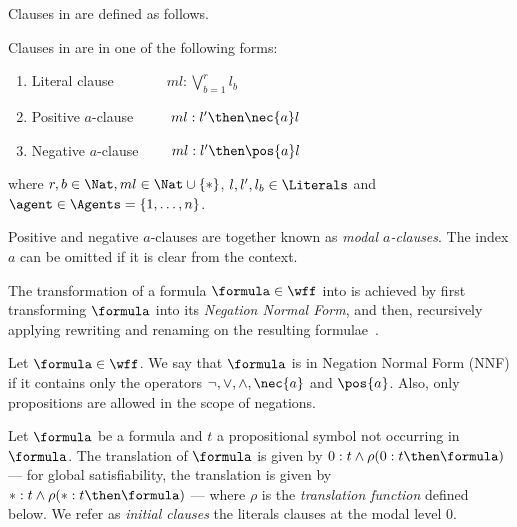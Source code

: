 Clauses in  are defined as follows.

\begin{definition}
    Clauses in  are in one of the following forms:
    \begin{enumerate}
        \item Literal clause $\ \ \quad \qquad ml : \bigvee^r_{b=1} l_b$
        \item Positive $a$-clause $\ \qquad ml : l' \then \nec{a} l$
        \item Negative $a$-clause $\qquad ml : l' \then \pos{a} l$
    \end{enumerate}
    where $r, b \in \Nat, ml \in \Nat \cup \{*\}$, $l, l', l_b \in
    \Literals$ and $\agent \in \Agents = \{1, \ldots, n\}$.
\end{definition}

Positive and negative $a$-clauses are together known as \emph{modal
$a$-clauses}. The index $a$ can be omitted if it is clear from the context.

The transformation of a formula $\formula \in \wff$ into  is achieved
by first transforming $\formula$ into its \emph{Negation Normal Form}, and then,
recursively applying rewriting and renaming on the resulting
formulae~\cite{plaisted1986structure}.

\begin{definition}
    Let $\formula \in \wff$. We say that $\formula$ is in Negation Normal Form (NNF) if
    it contains only the operators $\neg, \lor, \land, \nec{a}$ and $\pos{a}$. Also,
    only propositions are allowed in the scope of negations.
\end{definition}

Let $\formula$ be a formula and $t$ a propositional symbol not occurring in
$\formula$. The translation of $\formula$ is given by $0 : t \land \rho(0 : t
\then \formula)$ --- for global satisfiability, the translation is given by $* :
t \land \rho(* : t \then \formula)$ --- where $\rho$ is the \emph{translation
function} defined below. We refer as \emph{initial clauses} the literals clauses
at the modal level 0. 

